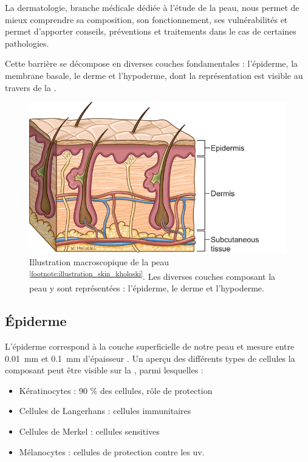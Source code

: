 La dermatologie, branche médicale dédiée à l’étude de la peau, nous permet de mieux comprendre sa composition, son fonctionnement, ses vulnérabilités et permet d’apporter conseils, préventions et traitements dans le cas de certaines pathologies.\par

Cette barrière se décompose en diverses couches fondamentales : l’épiderme, la membrane basale, le derme et l’hypoderme, dont la représentation est visible au travers de la .\par
\begin{figure}[H]
    \centering
    \includegraphics[width=0.6\linewidth]{contents/chapter_1/resources/illustration_skin_kholoski.png}
    \caption{Illustration macroscopique de la peau \textsuperscript{\ref{footnote:illustration_skin_kholoski}}. Les diverses couches composant la peau y sont représentées : l'épiderme, le derme et l'hypoderme.}
    \label{fig:illustration_skin_kholoski}
\end{figure}
\addtocounter{footnote}{1}
\clearpage

\subsection{Épiderme}
L’épiderme correspond à la couche superficielle de notre peau et mesure entre \SI{0,01}{\milli\metre} et \SI{0,1}{\milli\metre} d’épaisseur \cite{Sandby-Moller2003}. Un aperçu des différents types de cellules la composant peut être visible sur la , parmi lesquelles :
\begin{itemize}
\item Kératinocytes : 90 \% des cellules, rôle de protection
\item Cellules de Langerhans : cellules immunitaires
\item Cellules de Merkel : cellules sensitives
\item Mélanocytes : cellules de protection contre les \gls{uv}.
\end{itemize}\par

